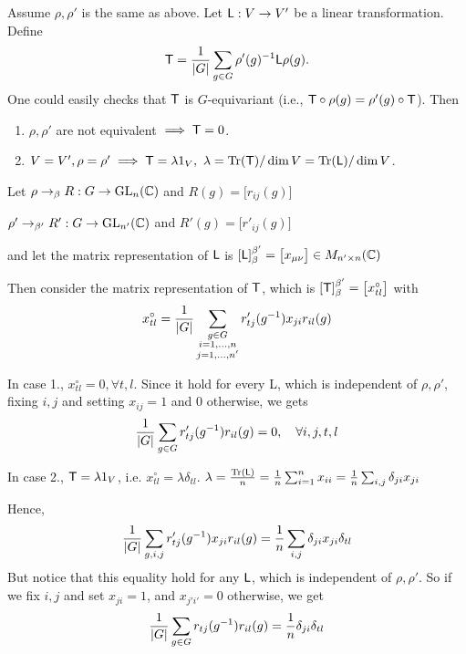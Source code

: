 \begin{coro}
  Assume $\rho, \rho'$ is the same as above. Let ${\sf L}: V \to V'$ be a linear transformation.
  Define
  \[
    {\sf T} = \frac{1}{\lvert G\rvert} \sum_{g\in G} \rho'(g)^{-1} {\sf L} \rho(g).
  \]
  One could easily checks that ${\sf T}$ is $G$-equivariant (i.e., ${\sf T} \circ \rho(g)
  = \rho'(g) \circ {\sf T}$). Then
  \begin{enumerate}
    \item $\rho, \rho'$ are not equivalent $\implies {\sf T} = 0$.
    \item $V = V', \rho = \rho' \implies {\sf T} = \lambda 1_V, \
      \lambda = \operatorname{Tr}({\sf T}) / \dim V = \operatorname{Tr}({\sf L}) / \dim V$.
  \end{enumerate}
\end{coro}

\begin{remark}
  Let $\rho \to_\beta R: G \to \text{GL}_n(\mathbb{C})$ and $R(g) = \big[r_{ij}(g)\big]$

  $\rho' \to_{\beta'} R': G \to \text{GL}_{n'}(\mathbb{C})$ and $R'(g) = \big[ r'_{ij}(g) \big]$

  and let the matrix representation of ${\sf L}$ is
  $[{\sf L}]^{\beta'}_\beta = \big[ x_{\mu\nu} \big] \in M_{n' \times n}(\mathbb{C})$

  Then consider the matrix representation of ${\sf T}$, which is
  $[{\sf T}]^{\beta'}_\beta = \big[ x^\circ_{tl} \big]$ with
  \[
    x^\circ_{tl} = \frac{1}{\lvert G\rvert}
    \sum_{\substack{g\in G \\ i=1,\dots, n \\ j=1,\dots, n'}}
    r'_{tj}(g^{-1})x_{ji}r_{il}(g)
  \]

  In case 1., $x^\circ_{tl} = 0, \forall t, l$. Since it hold for every {\sf L},
  which is independent of $\rho, \rho'$, fixing $i, j$ and setting $x_{ij} = 1$
  and $0$ otherwise, we gets
  \[ \frac{1}{\lvert G\rvert} \sum_{g \in G} r'_{tj}(g^{-1}) r_{il}(g) = 0,
    \quad \forall i, j, t, l \]


  In case 2., ${\sf T} = \lambda 1_V$, i.e.
  $x^\circ_{tl} = \lambda \delta_{tl}$.
  $\lambda = \frac{\operatorname{Tr}({\sf L})}{n} = \frac{1}{n} \sum_{i=1}^n x_{ii}
  = \frac{1}{n} \sum_{i,j} \delta_{ji}x_{ji}$

  Hence,
  \[
    \frac{1}{\lvert G\rvert} \sum_{g, i, j} r'_{tj}(g^{-1}) x_{ji} r_{il}(g)
    = \frac{1}{n} \sum_{i, j} \delta_{ji} x_{ji} \delta_{tl}
  \]
  But notice that this equality hold for any ${\sf L}$, which is independent of
  $\rho, \rho'$. So if we fix $i, j$ and set $x_{ji} = 1$, and $x_{j'i'} = 0$ otherwise,
  we get
  \[
    \frac{1}{\lvert G\rvert} \sum_{g\in G}
    r_{tj}(g^{-1})r_{il}(g) = \frac{1}{n} \delta_{ji}\delta_{tl}
  \]
\end{remark}


